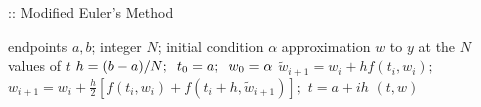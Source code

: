 \documentclass[12pt,oneside]{book}
\begin{document}
\begin{spacing}{1.2}
				\begin{algorithm}
					\caption{:: Modified Euler's Method}
					\begin{algorithmic}[1]
						\REQUIRE endpoints $ a, b $; \hspace*{0.2cm} integer $ N $; \hspace*{0.2cm} initial condition $ \alpha $
						\ENSURE approximation $ w $ to $ y $ at the $ N $ values of $ t $
						\STATE $ h = (b - a) / N; \hspace*{0.2cm} t_0 = a; \hspace*{0.2cm} w_{0} = \alpha $
							\STATE $ \tilde{w}_{i+1} = w_{i} + hf(t_{i},w_{i}); $ \hspace*{0.5cm} 
							\STATE $ w_{i+1} = w_{i} + \frac{h}{2} \left[ f(t_{i},w_{i}) + f(t_{i} + h,\tilde{w}_{i+1}) \right]; $ \hspace*{0.5cm} 
							\STATE $ t = a + ih $ \hspace*{0.5cm} 
						\ENDFOR
						\RETURN $ (t, w) $
					\end{algorithmic}
				\end{algorithm}
			
		\end{spacing}
		
	\clearpage
\end{document}
